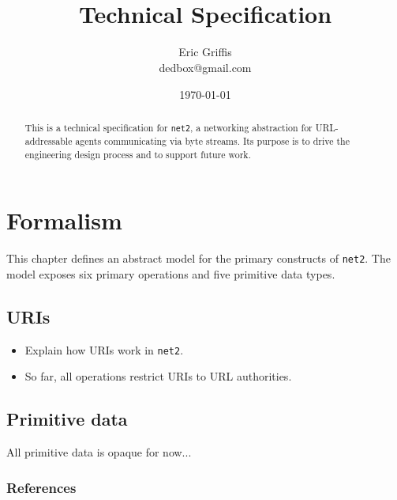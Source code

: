 \documentclass[letterpaper,12pt,openany]{report}
\title{\NetTwo  \\ Technical Specification}
\author{Eric Griffis \\ dedbox@gmail.com}
\date{\today}
\newcommand{\NetTwo}{\texttt{net2}}
\newenvironment{XXX}{\color{red}}{}
\newcommand{\xxx}[1]{\begin{XXX}#1\end{XXX}}
\DeclareMathOperator{\Ls}{\ensuremath{\mathcal{L}}}
\DeclareMathOperator{\Ts}{\ensuremath{\mathcal{T}}}
\begin{document}


\maketitle

\begin{abstract}
  This is a technical specification for {\NetTwo}, a networking abstraction
  for URL-addressable agents communicating via byte streams. Its purpose is to
  drive the engineering design process and to support future work.
\end{abstract}

\tableofcontents

\clearpage
{}
\setcounter{page}{1}
\pagestyle{plain}


\chapter{Formalism}

This chapter defines an abstract model for the primary constructs of
{\NetTwo}. The model exposes six primary operations and five primitive data
types.

\section{URIs}

\begin{XXX}
  \begin{itemize}
  \item Explain how URIs work in {\NetTwo}.
  \item So far, all operations restrict URIs to URL authorities.
  \end{itemize}
\end{XXX}

\section{Primitive data}

All primitive data is opaque \xxx{ for now...}

\subsection*{References}

\end{document}
